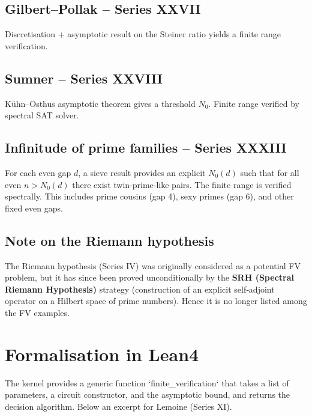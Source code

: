 \documentclass[11pt,a4paper]{article}
\begin{document}
\subsection{Gilbert–Pollak – Series XXVII}
Discretisation + asymptotic result on the Steiner ratio yields a finite range verification.

\subsection{Sumner – Series XXVIII}
Kühn–Osthus asymptotic theorem gives a threshold \(N_0\). Finite range verified by spectral SAT solver.

\subsection{Infinitude of prime families – Series XXXIII}
For each even gap \(d\), a sieve result provides an explicit \(N_0(d)\) such that for all even \(n > N_0(d)\) there exist twin‑prime‑like pairs. The finite range is verified spectrally. This includes prime cousins (gap 4), sexy primes (gap 6), and other fixed even gaps.

\subsection*{Note on the Riemann hypothesis}
The Riemann hypothesis (Series IV) was originally considered as a potential FV problem, but it has since been proved unconditionally by the \textbf{SRH (Spectral Riemann Hypothesis)} strategy (construction of an explicit self‑adjoint operator on a Hilbert space of prime numbers). Hence it is no longer listed among the FV examples.

\section{Formalisation in Lean4}

The kernel provides a generic function `finite_verification` that takes a list of parameters, a circuit constructor, and the asymptotic bound, and returns the decision algorithm. Below an excerpt for Lemoine (Series XI).
\end{document}
